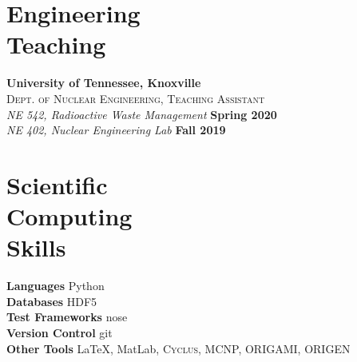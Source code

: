 \documentclass[margin,line]{resume}
\newcommand{\Cyclus}{\textsc{Cyclus}\xspace}%
\begin{document}
\begin{resume}
    \section{\mysidestyle Engineering\\Teaching}
    \textbf{University of Tennessee, Knoxville}\\
    \textsc{Dept. of Nuclear Engineering, Teaching Assistant}\\
               \textsl{NE 542, Radioactive Waste Management} \hfill \textbf{Spring 2020}\\
               \textsl{NE 402, Nuclear Engineering Lab} \hfill \textbf{Fall 2019}
               \vspace{2mm}
    \section{\mysidestyle Scientific\\Computing\\Skills}
                \textbf{Languages} \hfill Python\vspace{.5mm}\\%
                \textbf{Databases} \hfill HDF5\vspace{.5mm}\\%
                \textbf{Test Frameworks} \hfill nose\vspace{.5mm}\\%
                \textbf{Version Control} \hfill git\vspace{.5mm}\\%
                \textbf{Other Tools} \hfill \LaTeX, MatLab, \Cyclus, MCNP, ORIGAMI, ORIGEN\vspace{.5mm}%

\end{resume}
\end{document}
